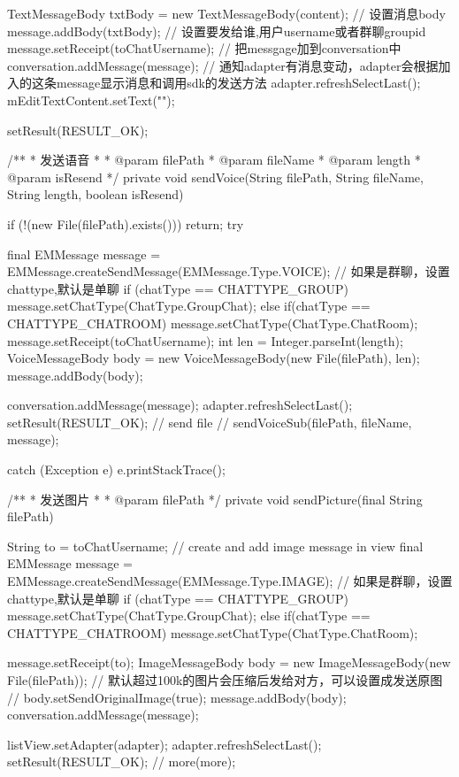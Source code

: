 {{{			TextMessageBody txtBody = new TextMessageBody(content);
			// 设置消息body
			message.addBody(txtBody);
			// 设置要发给谁,用户username或者群聊groupid
			message.setReceipt(toChatUsername);
			// 把messgage加到conversation中
			conversation.addMessage(message);
			// 通知adapter有消息变动，adapter会根据加入的这条message显示消息和调用sdk的发送方法
			adapter.refreshSelectLast();
			mEditTextContent.setText("");

			setResult(RESULT_OK);

		}
	}

	/**
	 * 发送语音
	 * 
	 * @param filePath
	 * @param fileName
	 * @param length
	 * @param isResend
	 */
	private void sendVoice(String filePath, String fileName, String length, boolean isResend) {
		if (!(new File(filePath).exists())) {
			return;
		}
		try {
			final EMMessage message = EMMessage.createSendMessage(EMMessage.Type.VOICE);
			// 如果是群聊，设置chattype,默认是单聊
			if (chatType == CHATTYPE_GROUP){
				message.setChatType(ChatType.GroupChat);
				}else if(chatType == CHATTYPE_CHATROOM){
				    message.setChatType(ChatType.ChatRoom);
				}
			message.setReceipt(toChatUsername);
			int len = Integer.parseInt(length);
			VoiceMessageBody body = new VoiceMessageBody(new File(filePath), len);
			message.addBody(body);

			conversation.addMessage(message);
			adapter.refreshSelectLast();
			setResult(RESULT_OK);
			// send file
			// sendVoiceSub(filePath, fileName, message);
		} catch (Exception e) {
			e.printStackTrace();
		}
	}

	/**
	 * 发送图片
	 * 
	 * @param filePath
	 */
	private void sendPicture(final String filePath) {
		String to = toChatUsername;
		// create and add image message in view
		final EMMessage message = EMMessage.createSendMessage(EMMessage.Type.IMAGE);
		// 如果是群聊，设置chattype,默认是单聊
		if (chatType == CHATTYPE_GROUP){
			message.setChatType(ChatType.GroupChat);
		}else if(chatType == CHATTYPE_CHATROOM){
		    message.setChatType(ChatType.ChatRoom);
		}

		message.setReceipt(to);
		ImageMessageBody body = new ImageMessageBody(new File(filePath));
		// 默认超过100k的图片会压缩后发给对方，可以设置成发送原图
		// body.setSendOriginalImage(true);
		message.addBody(body);
		conversation.addMessage(message);

		listView.setAdapter(adapter);
		adapter.refreshSelectLast();
		setResult(RESULT_OK);
		// more(more);
	}

}
